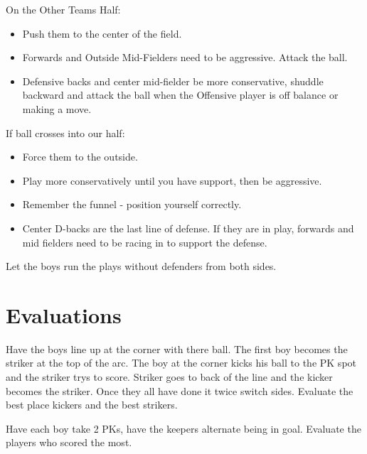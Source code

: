 \documentclass[10pt,letterpaper]{article}
\newenvironment{evenBlock}[1]{%
    \tcolorbox[beamer,%
    noparskip,breakable,
    colback=LightGreen,colframe=DarkGreen,%
    colbacklower=LimeGreen!75!LightGreen,%
    title=#1]}%
    {\endtcolorbox}
\newenvironment{oddBlock}[1]{%
    \tcolorbox[beamer,%
    noparskip,breakable,
    colback=LightBlue,colframe=DarkBlue,%
    colbacklower=DarkBlue!75!LightBlue,%
    title=#1]}%
    {\endtcolorbox}
\begin{document}
\begin{evenBlock}{Defensive Positioning}
    On the Other Teams Half:
    \begin{itemize}
        \item Push them to the center of the field.
        \item Forwards and Outside Mid-Fielders need to be aggressive.  Attack the ball.
        \item Defensive backs and center mid-fielder be more conservative, shuddle backward and attack the ball when the Offensive player is off balance or making a move.
    \end{itemize}
    If ball crosses into our half:
    \begin{itemize}
        \item Force them to the outside.
        \item Play more conservatively until you have support, then be aggressive.
        \item Remember the funnel - position yourself correctly.
        \item Center D-backs are the last line of defense.  If they are in play, forwards and mid fielders need to be racing in to support the defense.
    \end{itemize}
\end{evenBlock}

\begin{oddBlock}{Try It}
    Let the boys run the plays without defenders from both sides.
\end{oddBlock}

\section{Evaluations}

\begin{evenBlock}{Corner Kicks}
Have the boys line up at the corner with there ball.  The first boy becomes the striker at the top of the arc.
The boy at the corner kicks his ball to the PK spot and the striker trys to score.
Striker goes to back of the line and the kicker becomes the striker.
Once they all have done it twice switch sides. 
Evaluate the best place kickers and the best strikers.
\end{evenBlock}

\begin{oddBlock}{PKs}
Have each boy take 2 PKs, have the keepers alternate being in goal.  Evaluate the players who scored the most.
\end{oddBlock}
\end{document}

